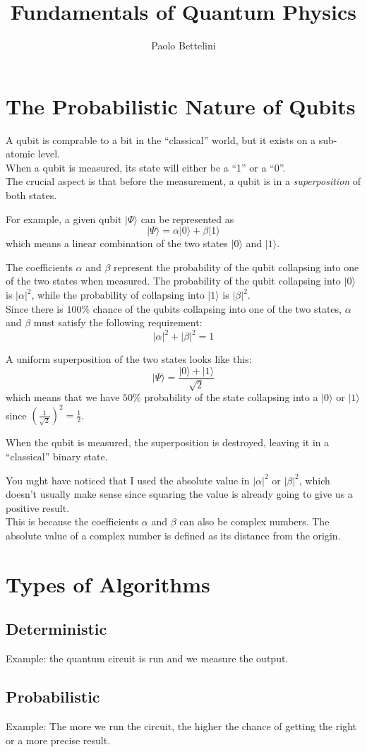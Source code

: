 \documentclass{article}
\title{Fundamentals of Quantum Physics }
\author{Paolo Bettelini}
\date{}
\newcommand{\quotes}[1]{``#1''}
\begin{document}
\maketitle
\tableofcontents
\pagebreak

\section{The Probabilistic Nature of Qubits}

A qubit is comprable to a bit in the \quotes{classical} world, but it exists on a sub-atomic level. \\
When a qubit is measured, its state will either be a \quotes{1} or a \quotes{0}. \\
The crucial aspect is that before the measurement, a qubit is in a \textit{superposition} of both states.

For example, a given qubit \(|\Psi\rangle\) can be represented as
\[
    |\Psi\rangle=\alpha |0\rangle+\beta |1\rangle
\]
which means a linear combination of the two states \(|0\rangle\) and \(|1\rangle\).

The coefficients \(\alpha\) and \(\beta\) represent the probability of the qubit collapsing into one of the two states when measured.
The probability of the qubit collapsing into \(|0\rangle\) is \(|\alpha|^2\),
while the probability of collapsing into \(|1\rangle\) is \(|\beta|^2\). \\
Since there is \(100\%\) chance of the qubits collapsing into one of the two states, \(\alpha\) and \(\beta\) must satisfy the following requirement:
\[
    |\alpha|^2+|\beta|^2=1
\]

A uniform superposition of the two states looks like this:
\[
    |\Psi\rangle=\frac{|0\rangle+|1\rangle}{\sqrt{2}}
\]
which means that we have \(50\%\) probability of the state collapsing into a \(|0\rangle\) or \(|1\rangle\)
since \({\left(\frac{1}{\sqrt{2}}\right)}^2=\frac{1}{2}\).

When the qubit is measured, the superposition is destroyed, leaving it in a \quotes{classical} binary state.

You mght have noticed that I used the absolute value in \(|\alpha|^2\) or \(|\beta|^2\), which doesn't usually make sense since squaring the value is already going to give us a positive result.
\\
This is because the coefficients \(\alpha\) and \(\beta\) can also be complex numbers. The absolute value of a complex number is defined as its distance from the origin.

\section{Types of Algorithms}

\subsection{Deterministic}

Example: the quantum circuit is run and we measure the output.

\subsection{Probabilistic}

Example: The more we run the circuit, the higher the chance of getting the right or a more precise result.
\end{document}
